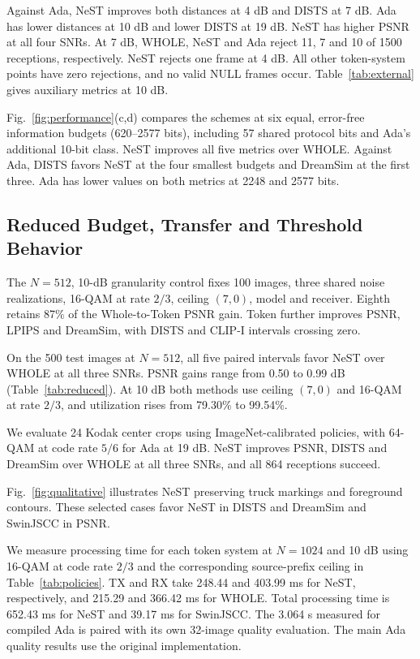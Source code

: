Against Ada, NeST improves both distances at 4 dB and DISTS at 7 dB. Ada has lower distances at 10 dB and lower DISTS at 19 dB. NeST has higher PSNR at all four SNRs. At 7 dB, WHOLE, NeST and Ada reject 11, 7 and 10 of 1500 receptions, respectively. NeST rejects one frame at 4 dB. All other token-system points have zero rejections, and no valid NULL frames occur. Table~\ref{tab:external} gives auxiliary metrics at 10 dB.

Fig.~\ref{fig:performance}(c,d) compares the schemes at six equal, error-free information budgets (620--2577 bits), including 57 shared protocol bits and Ada's additional 10-bit class. NeST improves all five metrics over WHOLE. Against Ada, DISTS favors NeST at the four smallest budgets and DreamSim at the first three. Ada has lower values on both metrics at 2248 and 2577 bits.

\subsection{Reduced Budget, Transfer and Threshold Behavior}


The $N=512$, 10-dB granularity control fixes 100 images, three shared noise realizations, 16-QAM at rate $2/3$, ceiling $(7,0)$, model and receiver. Eighth retains 87\% of the Whole-to-Token PSNR gain. Token further improves PSNR, LPIPS and DreamSim, with DISTS and CLIP-I intervals crossing zero.

On the 500 test images at $N=512$, all five paired intervals favor NeST over WHOLE at all three SNRs. PSNR gains range from 0.50 to 0.99 dB (Table~\ref{tab:reduced}). At 10 dB both methods use ceiling $(7,0)$ and 16-QAM at rate $2/3$, and utilization rises from 79.30\% to 99.54\%.

We evaluate 24 Kodak center crops using ImageNet-calibrated policies, with 64-QAM at code rate $5/6$ for Ada at 19 dB. NeST improves PSNR, DISTS and DreamSim over WHOLE at all three SNRs, and all 864 receptions succeed.



Fig.~\ref{fig:qualitative} illustrates NeST preserving truck markings and foreground contours. These selected cases favor NeST in DISTS and DreamSim and SwinJSCC in PSNR.

We measure processing time for each token system at $N=1024$ and 10 dB using 16-QAM at code rate $2/3$ and the corresponding source-prefix ceiling in Table~\ref{tab:policies}. TX and RX take 248.44 and 403.99 ms for NeST, respectively, and 215.29 and 366.42 ms for WHOLE. Total processing time is 652.43 ms for NeST and 39.17 ms for SwinJSCC. The 3.064 s measured for compiled Ada is paired with its own 32-image quality evaluation. The main Ada quality results use the original implementation.
